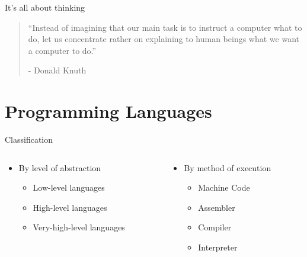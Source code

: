 \documentclass[10pt, compress]{beamer}
\begin{document}
\begin{slide}
	\begin{block}{It's all about thinking}
		\begin{quote}
		``Instead of imagining that our main task is to instruct a computer what to do, let us concentrate rather on explaining to human beings what we want a computer to do.''
		\begin{flushright}
		- Donald Knuth
		\end{flushright}
		\end{quote}
	\end{block}
\end{slide}

\section{Programming Languages}

\begin{slide}
	\begin{block}{Classification}
		\begin{columns}
			\begin{column}{0.5\textwidth}
			\begin{itemize}
				\item[] By level of abstraction
				\begin{itemize}
					\item[] Low-level languages
					\item[] High-level languages
					\item[] Very-high-level languages
				\end{itemize}
			\end{itemize}
			\end{column}
			\begin{column}{0.5\textwidth}
			\begin{itemize}
				\item[] By method of execution
				\begin{itemize}
					\item[] Machine Code
					\item[] Assembler
					\item[] Compiler
					\item[] Interpreter
				\end{itemize}
			\end{itemize}
			\end{column}
		\end{columns}
	\end{block}
\end{slide}
\end{document}
